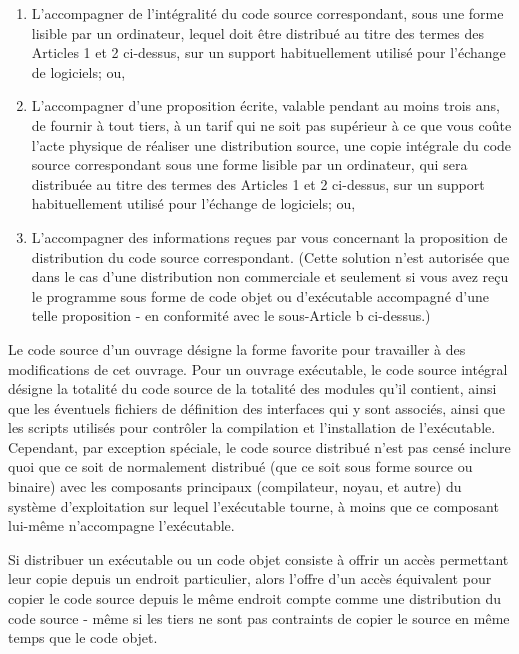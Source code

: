 {\begin{enumerate}
\begin{enumerate}
\item L'accompagner de l'intégralité du code source correspondant, sous une forme lisible par un ordinateur, lequel doit être distribué au titre des termes des Articles 1 et 2 ci-dessus, sur un support habituellement utilisé pour l'échange de logiciels; ou,

\item L'accompagner d'une proposition écrite, valable pendant au moins trois ans, de fournir à tout tiers, à un tarif qui ne soit pas supérieur à ce que vous coûte l'acte physique de réaliser une distribution source, une copie intégrale du code source correspondant sous une forme lisible par un ordinateur, qui sera distribuée au titre des termes des Articles 1 et 2 ci-dessus, sur un support habituellement utilisé pour l'échange de logiciels; ou,

\item  L'accompagner des informations reçues par vous concernant la proposition de distribution du code source correspondant. (Cette solution n'est autorisée que dans le cas d'une distribution non commerciale et seulement si vous avez reçu le programme sous forme de code objet ou d'exécutable accompagné d'une telle proposition - en conformité avec le sous-Article b ci-dessus.)
\end{enumerate}

Le code source d'un ouvrage désigne la forme favorite pour travailler à des modifications de cet ouvrage. Pour un ouvrage exécutable, le code source intégral désigne la totalité du code source de la totalité des modules qu'il contient, ainsi que les éventuels fichiers de définition des interfaces qui y sont associés, ainsi que les scripts utilisés pour contrôler la compilation et l'installation de l'exécutable. Cependant, par exception spéciale, le code source distribué n'est pas censé inclure quoi que ce soit de normalement distribué (que ce soit sous forme source ou binaire) avec les composants principaux (compilateur, noyau, et autre) du système d'exploitation sur lequel l'exécutable tourne, à moins que ce composant lui-même n'accompagne l'exécutable.

Si distribuer un exécutable ou un code objet consiste à offrir un accès permettant leur copie depuis un endroit particulier, alors l'offre d'un accès équivalent pour copier le code source depuis le même endroit compte comme une distribution du code source - même si les tiers ne sont pas contraints de copier le source en même temps que le code objet.


\end{enumerate}}
